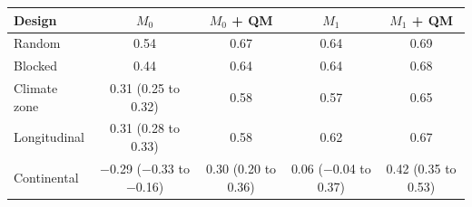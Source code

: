 \begin{tabular}{lcccc}
\toprule
Design & $M_0$ & $M_0$ + QM & $M_1$ & $M_1$ + QM \\
\midrule
Random & 0.54 & 0.67 & 0.64 & 0.69 \\
Blocked & 0.44 & 0.64 & 0.64 & 0.68 \\
Climate zone & 0.31 (0.25 to 0.32) & 0.58 & 0.57 & 0.65 \\
Longitudinal & 0.31 (0.28 to 0.33) & 0.58 & 0.62 & 0.67 \\
Continental & $-$0.29 ($-$0.33 to $-$0.16) & 0.30 (0.20 to 0.36) & 0.06 ($-$0.04 to 0.37) & 0.42 (0.35 to 0.53) \\
\bottomrule
\end{tabular}
